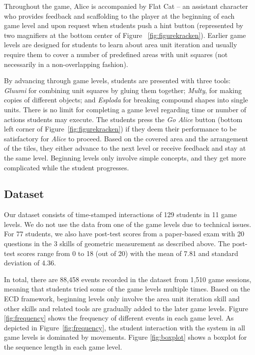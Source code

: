 \documentclass{sigchi}
\begin{document}
	Throughout the game,  Alice is accompanied by Flat Cat -- an assistant character who provides feedback and scaffolding to the player at the beginning of each game level and upon request when students push a hint button (represented by two magnifiers at the bottom center of Figure ~\ref{fig:figurekracken}).
	Earlier game levels are designed for students to learn about area unit iteration and usually require them to cover a number of predefined areas with unit squares (not necessarily in a non-overlapping fashion).
	 
	By advancing through game levels, students are presented with three tools: \textit {Gluumi} for combining unit squares by gluing them together; \textit {Multy}, for making copies of different objects; and \textit {Esploda} for breaking compound shapes into single units.  
	There is no limit for completing a game level regarding time or number of actions students may execute. 
	The students press the \textit {Go Alice} button (bottom left corner of Figure~\ref{fig:figurekracken}) if they deem their performance to be satisfactory for \textit {Alice} to proceed. 
	Based on the covered area and the arrangement of the tiles, they either advance to the next level or receive feedback and stay at the same level.
	Beginning levels only involve simple concepts, and they get more complicated while the student progresses.
	
	\subsection{Dataset} 
	Our dataset consists of time-stamped interactions of 129 students in 11 game levels. 
	We do not use the data from one of the game levels due to technical issues.
	For 77 students, we also have post-test scores from a paper-based exam with 20 questions in the 3 skills of geometric measurement as described above.
	The post-test scores range from 0 to 18 (out of 20) with the mean of 7.81 and standard deviation of 4.36. 

	In total, there are 88,458 events recorded in the dataset from 1,510 game sessions, meaning that students tried some of the game levels  multiple times.
	Based on the ECD framework, beginning levels only involve the area unit iteration skill and other skills and related tools are gradually added to the later game levels.
	Figure \ref{fig:frequency} shows the frequency of different events in each game level. 
	As depicted in Figure~\ref{fig:frequency}, the student interaction with the system in all game levels is dominated by movements.
	Figure \ref{fig:boxplot} shows a boxplot for the sequence length in each game level. 
\end{document}
